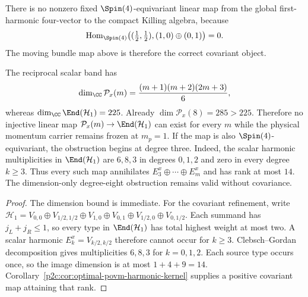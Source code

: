 \documentclass[12pt,a4paper]{article}
\begin{document}
\begin{proposition}
\label{p2c:prop:no-fixed-global-xp-linear-map}
There is no nonzero fixed $\Spin(4)$-equivariant linear map from the global
first-harmonic four-vector to the compact Killing algebra, because
\[
 \operatorname{Hom}_{\Spin(4)}\!\left((\tfrac12,\tfrac12),(1,0)\oplus(0,1)\right)=0.
\]
The moving bundle map above is therefore the correct covariant object.
\end{proposition}

\begin{proposition}
\label{p2c:prop:no-faithful-allband-xp-map}
The reciprocal scalar band has
\[
 \dim_\CC\mathcal P_x(m)=\frac{(m+1)(m+2)(2m+3)}6,
\]
whereas $\dim_\CC\End(\mathcal H_1)=225$.  Already
$\dim\mathcal P_x(8)=285>225$.  Therefore no injective linear map
$\mathcal P_x(m)\to\End(\mathcal H_1)$ can exist for every $m$ while the
physical momentum carrier remains frozen at $m_p=1$.
If the map is also $\Spin(4)$-equivariant, the obstruction begins at degree
three. Indeed, the scalar harmonic multiplicities in $\End(\mathcal H_1)$
are $6,8,3$ in degrees $0,1,2$ and zero in every degree $k\ge3$.
Thus every such map annihilates $E_3^x\oplus\cdots\oplus E_m^x$ and has rank
at most $14$. The dimension-only degree-eight obstruction remains valid
without covariance.
\end{proposition}
\begin{proof}
The dimension bound is immediate. For the covariant refinement, write
$\mathcal H_1=V_{0,0}\oplus V_{1/2,1/2}\oplus V_{1,0}\oplus V_{0,1}
\oplus V_{1/2,0}\oplus V_{0,1/2}$.
Each summand has $j_L+j_R\le1$, so every type in
$\End(\mathcal H_1)$ has total highest weight at most two. A scalar harmonic
$E_k^x=V_{k/2,k/2}$ therefore cannot occur for $k\ge3$.
Clebsch--Gordan decomposition gives multiplicities $6,8,3$ for $k=0,1,2$.
Each source type occurs once, so the image dimension is at most $1+4+9=14$.
Corollary~\ref{p2c:cor:optimal-povm-harmonic-kernel} supplies a positive
covariant map attaining that rank.
\end{proof}
\end{document}
